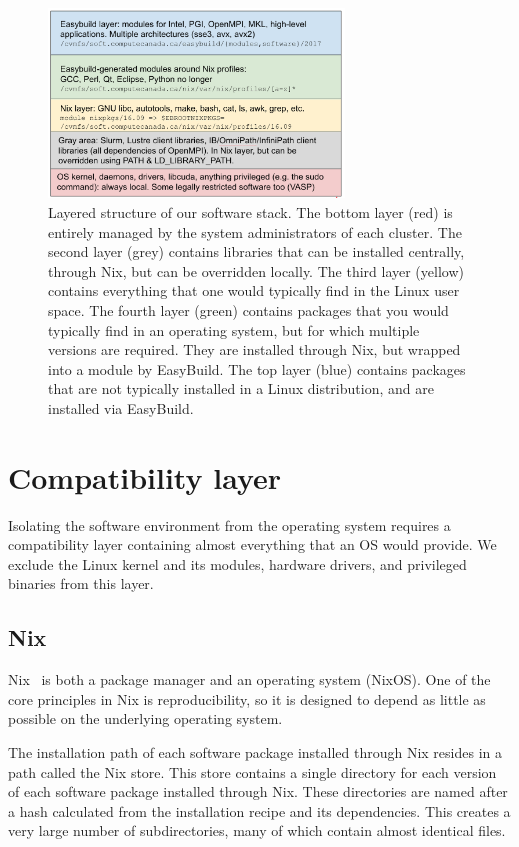 \documentclass[sigconf]{acmart}
\begin{document}
\begin{figure}
  \includegraphics[width=0.7\textwidth]{layers.png}
  \caption{Layered structure of our software stack. The bottom layer (red) is entirely managed by the system administrators of each cluster. The second layer (grey) contains libraries that can be installed centrally, through Nix, but can be overridden locally. The third layer (yellow) contains everything that one would typically find in the Linux user space. The fourth layer (green) contains packages that you would typically find in an operating system, but for which multiple versions are required. They are installed through Nix, but wrapped into a module by EasyBuild. The top layer (blue) contains packages that are not typically installed in a Linux distribution, and are installed via EasyBuild.}
  \label{tab:layers}
\end{figure}

\section{Compatibility layer}
\label{sec:Compatibility_layer}
Isolating the software environment from the operating system requires a compatibility layer containing almost everything that an OS would provide. We exclude the Linux kernel and its modules, hardware drivers, and privileged binaries from this layer.

\subsection{Nix}
\label{sub:Nix}
Nix~\cite{Nix} is both a package manager and an operating system (NixOS). One of the core principles in Nix is reproducibility, so it is designed to depend as little as possible on the underlying operating system. 

The installation path of each software package installed through Nix resides in a path called the Nix store. This store contains a single directory for each version of each software package installed through Nix. These directories are named after a hash calculated from the installation recipe and its dependencies. This creates a very large number of subdirectories, many of which contain almost identical files. 
\end{document}
